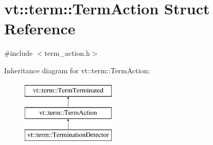 \hypertarget{structvt_1_1term_1_1_term_action}{}\section{vt\+:\+:term\+:\+:Term\+Action Struct Reference}
\label{structvt_1_1term_1_1_term_action}


{\ttfamily \#include $<$term\+\_\+action.\+h$>$}

Inheritance diagram for vt\+:\+:term\+:\+:Term\+Action\+:\begin{figure}[H]
\begin{center}
\leavevmode
\includegraphics[height=3.000000cm]{structvt_1_1term_1_1_term_action}
\end{center}
\end{figure}
